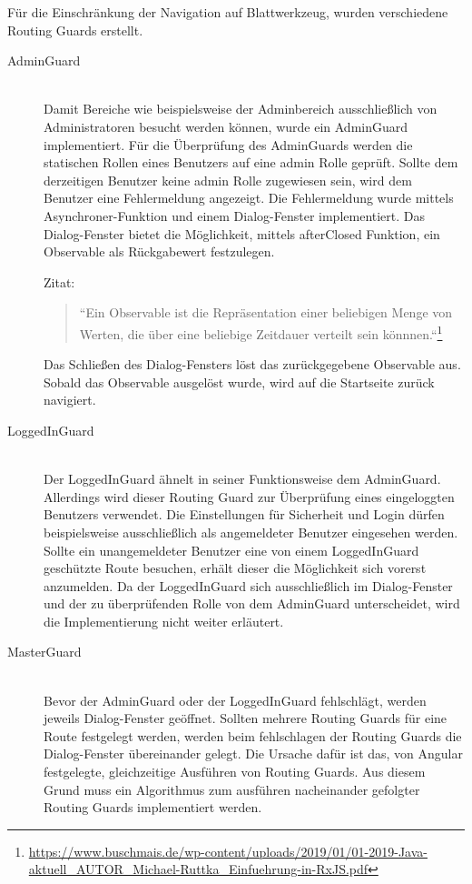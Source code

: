 Für die Einschränkung der Navigation auf Blattwerkzeug, wurden verschiedene Routing Guards erstellt.

\begin{description}
	\item[AdminGuard]\hfill\\
	Damit Bereiche wie beispielsweise der Adminbereich ausschließlich von Administratoren besucht werden können, wurde ein AdminGuard implementiert. Für die Überprüfung des AdminGuards werden die statischen Rollen eines Benutzers auf eine admin Rolle geprüft. Sollte dem derzeitigen Benutzer keine admin Rolle zugewiesen sein, wird dem Benutzer eine Fehlermeldung angezeigt. Die Fehlermeldung wurde mittels Asynchroner-Funktion und einem Dialog-Fenster implementiert. Das Dialog-Fenster bietet die Möglichkeit, mittels afterClosed Funktion, ein Observable als Rückgabewert festzulegen.
	
	Zitat:
	 \begin{quote}
		``Ein Observable ist die Repräsentation einer beliebigen Menge von Werten, die über eine beliebige Zeitdauer verteilt sein könnnen.``\footnote{\url{https://www.buschmais.de/wp-content/uploads/2019/01/01-2019-Java-aktuell_AUTOR_Michael-Ruttka_Einfuehrung-in-RxJS.pdf}}
	\end{quote}

	Das Schließen des Dialog-Fensters löst das zurückgegebene Observable aus. Sobald das Observable ausgelöst wurde, wird auf die Startseite zurück navigiert.
	
	\item[LoggedInGuard]\hfill\\
	Der LoggedInGuard ähnelt in seiner Funktionsweise dem AdminGuard. Allerdings wird dieser Routing Guard zur Überprüfung eines eingeloggten Benutzers verwendet. Die Einstellungen für Sicherheit und Login dürfen beispielsweise ausschließlich als angemeldeter Benutzer eingesehen werden. Sollte ein unangemeldeter Benutzer eine von einem LoggedInGuard geschützte Route besuchen, erhält dieser die Möglichkeit sich vorerst anzumelden. Da der LoggedInGuard sich ausschließlich im Dialog-Fenster und der zu überprüfenden Rolle von dem AdminGuard unterscheidet, wird die Implementierung nicht weiter erläutert.
	
	\item[MasterGuard]\hfill\\
	Bevor der AdminGuard oder der LoggedInGuard fehlschlägt, werden jeweils Dialog-Fenster geöffnet. Sollten mehrere Routing Guards für eine Route festgelegt werden, werden beim fehlschlagen der Routing Guards die Dialog-Fenster übereinander gelegt. Die Ursache dafür ist das, von Angular festgelegte, gleichzeitige Ausführen von Routing Guards. Aus diesem Grund muss ein Algorithmus zum ausführen nacheinander gefolgter Routing Guards implementiert werden. 
	

\end{description}
